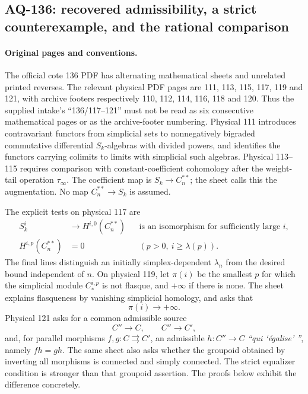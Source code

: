 \subsection{AQ-136: recovered admissibility, a strict counterexample, and the rational comparison}

\paragraph{Original pages and conventions.}
The official cote 136 PDF has alternating mathematical sheets and
unrelated printed reverses.  The relevant physical PDF pages are
111, 113, 115, 117, 119 and 121, with archive footers respectively
110, 112, 114, 116, 118 and 120.  Thus the supplied intake's
``136/117--121'' must not be read as six consecutive mathematical
pages or as the archive-footer numbering.
Physical 111 introduces contravariant functors from simplicial
sets to nonnegatively bigraded commutative differential
$S_k$-algebras with divided powers, and identifies the functors
carrying colimits to limits with simplicial such algebras.
Physical 113--115 requires comparison with constant-coefficient
cohomology after the weight-tail operation $\tau_\infty$.
The coefficient map is $S_k\longrightarrow C_n^{**}$; the sheet
calls this the augmentation.  No map $C_n^{**}\to S_k$ is assumed.

The explicit tests on physical 117 are
\begin{equation}
 \begin{aligned}
 S_k^i&\longrightarrow H^{i,0}(C_n^{**})
  &&\text{is an isomorphism for sufficiently large }i,\\
 H^{i,p}(C_n^{**})&=0
  &&(p>0,\ i\geq\lambda(p)).
 \end{aligned}                                           \tag{136.3}
\end{equation}
The final lines distinguish an initially simplex-dependent
$\lambda_n$ from the desired bound independent of $n$.
On physical 119, let $\pi(i)$ be the smallest $p$ for which the
simplicial module $C_*^{i,p}$ is not flasque, and $+\infty$ if
there is none.  The sheet explains flasqueness by vanishing
simplicial homology, and asks that
\[
                         \pi(i)\longrightarrow+\infty.
                                                               \tag{136.4}
\]
Physical 121 asks for a common admissible source
\[
 C''\longrightarrow C,\qquad C''\longrightarrow C',              \tag{136.a}
\]
and, for parallel morphisms $f,g:C\rightrightarrows C'$, an
admissible $h:C''\to C$ \emph{``qui `\'egalise' ''}, namely
$fh=gh$.  The same sheet also asks whether the groupoid obtained
by inverting all morphisms is connected and simply connected.
The strict equalizer condition is stronger than that groupoid
assertion.  The proofs below exhibit the difference concretely.

